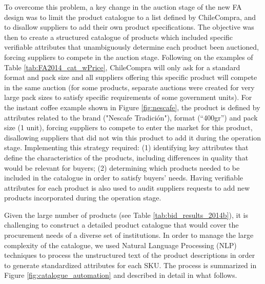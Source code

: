 To overcome this problem, a key change in the auction stage of the new FA design was to limit the product catalogue to a list defined by ChileCompra, and to disallow suppliers to add their own product specifications. The objective was then to create a structured catalogue of products which included specific verifiable attributes that unambiguously determine each product been auctioned, forcing suppliers to compete in the auction stage. {Following on the examples of Table \ref{tab:FA2014_cat_wPrice}, ChileCompra will only ask for a standard {format and} pack size and all suppliers offering this specific product will compete in the same auction (for some products, separate auctions were created for very large pack sizes to satisfy specific requirements of some government units). For the instant coffee example shown in Figure \ref{fig:nescafe}, the product is defined by attributes related to the brand ("Nescafe Tradición"), format (``400gr'') and pack size (1 unit), forcing suppliers to compete to enter the market for this product, disallowing suppliers that did not win this product to add it during the operation stage. Implementing this strategy required: (1) identifying key attributes that define the characteristics of the products, including differences in quality that would be relevant for buyers; (2) determining which products needed to be included in the catalogue in order to satisfy buyers' needs. Having verifiable attributes for each product is also used to audit suppliers requests to add new products incorporated during the operation stage.}

Given the large number of products (see Table \ref{tab:bid_results_2014b}), it is challenging to construct a detailed product catalogue that would cover the procurement needs of a diverse set of institutions. In order to manage the large complexity of the catalogue, we used Natural Language Processing (NLP) techniques to process the unstructured text of the product descriptions in order to generate standardized attributes for each SKU.  The process is summarized in Figure \ref{fig:catalogue_automation} and described in detail in what follows.

